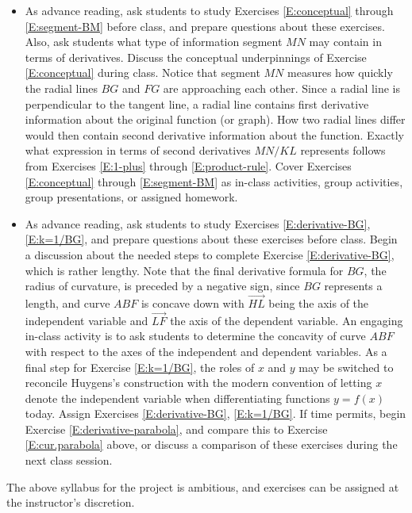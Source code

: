 \documentclass[12pt]{article}
\theoremstyle{definition}
\begin{document}
\begin{itemize}
\item[{\bf{Day 5.}}]  As advance reading, ask students to study Exercises \eqref{E:conceptual} through \eqref{E:segment-BM}
before class, and prepare questions about these exercises.  Also, ask students what type of information segment 
$MN$ may contain in terms of derivatives.  Discuss the conceptual underpinnings of Exercise \eqref{E:conceptual} 
during class.  Notice that segment $MN$ measures how quickly the radial lines $BG$ and $FG$ are approaching each other.
Since a radial line is perpendicular to the tangent line, a radial line contains first derivative information about the original
function (or graph).  How two radial lines differ would then contain second derivative information about the function.  
Exactly what expression in terms of second derivatives $MN/KL$ represents follows from Exercises \eqref{E:1-plus} through
\eqref{E:product-rule}.  Cover Exercises \eqref{E:conceptual} through \eqref{E:segment-BM} as in-class activities, group 
activities, group presentations, or assigned homework.  

\item[{\bf{Day 6.}}]  As advance reading, ask students to study Exercises \eqref{E:derivative-BG}, \eqref{E:k=1/BG}, 
and prepare questions about these exercises before class.  Begin a discussion about the needed steps to complete
Exercise \eqref{E:derivative-BG}, which is rather lengthy.  Note that the final derivative formula for $BG$, the radius of curvature, 
is preceded by a negative sign, since $BG$ represents a length, and curve $ABF$ is concave down 
with $\overset{\longrightarrow}{HL}$ being  the axis of the independent variable and $\overset{\longrightarrow}{LF}$ 
the axis of the dependent variable.  An engaging in-class activity is to ask students to determine the concavity 
of curve $ABF$ with respect to the axes of the independent and dependent variables.
As a final step for Exercise \eqref{E:k=1/BG}, the roles of $x$
and $y$ may be switched to reconcile Huygens's construction with the modern convention of letting $x$ denote the
independent variable when differentiating functions $y = f(x)$ today.  Assign Exercises
\eqref{E:derivative-BG}, \eqref{E:k=1/BG}.  If time permits, begin Exercise
\eqref{E:derivative-parabola}, and compare this to Exercise \eqref{E:cur.parabola} above, or discuss
a comparison of these exercises during the next class session.  
   
\end{itemize}
   
The above syllabus for the project is ambitious, and exercises can be assigned at the
instructor's discretion.  
\end{document}
